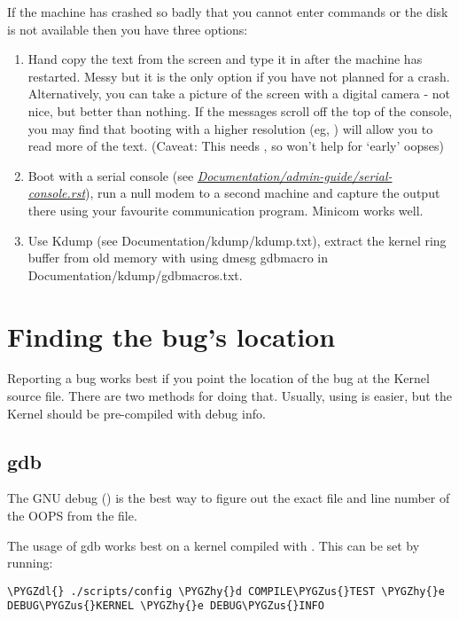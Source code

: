 \documentclass[a4paper,8pt,english]{sphinxmanual}
\def\PYGZus{\char`\_}
\def\PYGZdl{\char`\$}
\def\PYGZhy{\char`\-}
\begin{document}
If the machine has crashed so badly that you cannot enter commands or
the disk is not available then you have three options:
\begin{enumerate}
\item {} 
Hand copy the text from the screen and type it in after the machine
has restarted.  Messy but it is the only option if you have not
planned for a crash. Alternatively, you can take a picture of
the screen with a digital camera - not nice, but better than
nothing.  If the messages scroll off the top of the console, you
may find that booting with a higher resolution (eg, )
will allow you to read more of the text. (Caveat: This needs ,
so won't help for `early' oopses)

\item {} 
Boot with a serial console (see
{\hyperref[admin\string-guide/serial\string-console:serial\string-console]{\emph{Documentation/admin-guide/serial-console.rst}}}),
run a null modem to a second machine and capture the output there
using your favourite communication program.  Minicom works well.

\item {} 
Use Kdump (see Documentation/kdump/kdump.txt),
extract the kernel ring buffer from old memory with using dmesg
gdbmacro in Documentation/kdump/gdbmacros.txt.

\end{enumerate}


\section{Finding the bug's location}
\label{admin-guide/bug-hunting:finding-the-bug-s-location}
Reporting a bug works best if you point the location of the bug at the
Kernel source file. There are two methods for doing that. Usually, using
 is easier, but the Kernel should be pre-compiled with debug info.


\subsection{gdb}
\label{admin-guide/bug-hunting:gdb}
The GNU debug () is the best way to figure out the exact file and line
number of the OOPS from the  file.

The usage of gdb works best on a kernel compiled with .
This can be set by running:

\begin{Verbatim}[commandchars=\\\{\}]
\PYGZdl{} ./scripts/config \PYGZhy{}d COMPILE\PYGZus{}TEST \PYGZhy{}e DEBUG\PYGZus{}KERNEL \PYGZhy{}e DEBUG\PYGZus{}INFO
\end{Verbatim}
\end{document}
